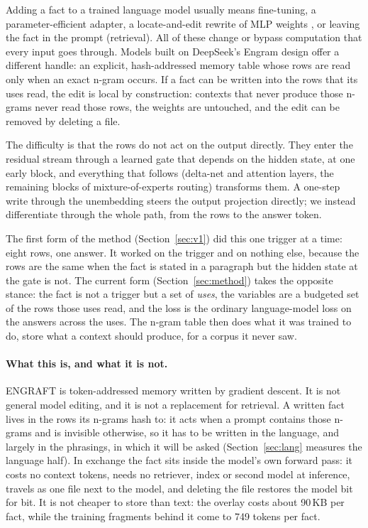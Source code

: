 \documentclass[10pt,a4paper]{article}
\begin{document}
Adding a fact to a trained language model usually means fine-tuning, a parameter-efficient
adapter, a locate-and-edit rewrite of MLP weights \cite{rome,memit}, or leaving the fact in
the prompt (retrieval). All of these change or bypass computation that every input goes
through. Models built on DeepSeek's Engram design \cite{engram} offer a different handle:
an explicit, hash-addressed memory table whose rows are read only when an exact n-gram
occurs. If a fact can be written into the rows that its uses read, the edit is local by
construction: contexts that never produce those n-grams never read those rows, the
weights are untouched, and the edit can be removed by deleting a file.

The difficulty is that the rows do not act on the output directly. They enter the residual
stream through a learned gate that depends on the hidden state, at one early block, and
everything that follows (delta-net and attention layers, the remaining blocks of
mixture-of-experts routing) transforms them. A one-step write through the unembedding
\cite{userengram} steers the output projection directly; we instead differentiate through
the whole path, from the rows to the answer token.

The first form of the method (Section~\ref{sec:v1}) did this one trigger at a time: eight
rows, one answer. It worked on the trigger and on nothing else, because the rows are the
same when the fact is stated in a paragraph but the hidden state at the gate is not. The
current form (Section~\ref{sec:method}) takes the opposite stance: the fact is not a
trigger but a set of \emph{uses}, the variables are a budgeted set of the rows those uses read, and the
loss is the ordinary language-model loss on the answers across the uses. The n-gram table
then does what it was trained to do, store what a context should produce, for a corpus it
never saw.

\paragraph{What this is, and what it is not.} ENGRAFT is token-addressed memory written by
gradient descent. It is not general model editing, and it is not a replacement for retrieval.
A written fact lives in the rows its n-grams hash to: it acts when a prompt contains those
n-grams and is invisible otherwise, so it has to be written in the language, and largely in
the phrasings, in which it will be asked (Section~\ref{sec:lang} measures the language half).
In exchange the fact sits inside the model's own forward pass: it costs no context tokens,
needs no retriever, index or second model at inference, travels as one file next to the
model, and deleting the file restores the model bit for bit. It is not cheaper to store than
text: the overlay costs about 90\,KB per fact, while the training fragments behind it come to
749 tokens per fact.
\end{document}
